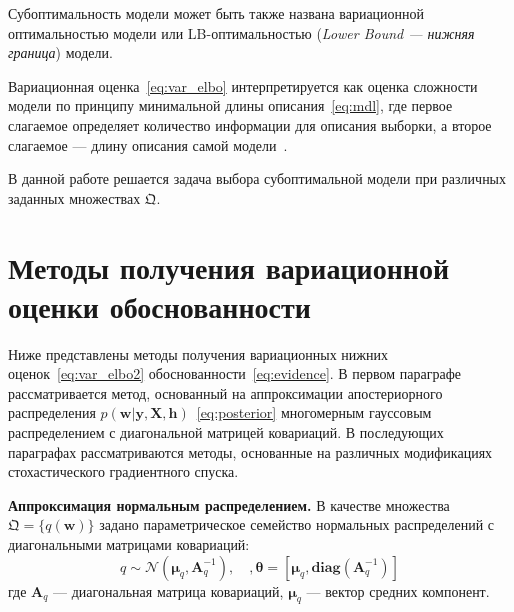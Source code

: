 {
Субоптимальность модели может быть также названа вариационной оптимальностью модели или LB-оптимальностью (\textit{Lower Bound --- нижняя граница}) модели.}

Вариационная оценка~\eqref{eq:var_elbo} интерпретируется как оценка сложности модели по принципу минимальной длины описания~\eqref{eq:mdl}, где первое слагаемое определяет количество информации для описания выборки, а второе слагаемое --- длину описания самой модели~\cite{nips}.

В данной работе решается задача выбора субоптимальной модели при различных заданных множествах $\mathfrak{Q}$.

\section{Методы получения вариационной оценки обоснованности}
Ниже представлены методы получения вариационных нижних оценок~\eqref{eq:var_elbo2} обоснованности~\eqref{eq:evidence}. В первом параграфе рассматривается метод, основанный на аппроксимации апостериорного распределения $p( \mathbf{w}|\mathbf{y}, \mathbf{X}, \mathbf{h})$~\eqref{eq:posterior} многомерным гауссовым распределением с диагональной матрицей ковариаций. В последующих параграфах рассматриваются методы, основанные на различных модификациях стохастического градиентного спуска. 

\textbf{Аппроксимация нормальным распределением. }
В качестве множества $\mathfrak{Q} = \{q(\mathbf{w})\}$ задано параметрическое семейство нормальных распределений с диагональными матрицами ковариаций:
\begin{equation}
\label{eq:diag}
	q \sim \mathcal{N}(\boldsymbol{\mu}_q, \mathbf{A}^{-1}_q),\quad,\boldsymbol{\theta}=[\boldsymbol{\mu}_q, \textbf{diag}(\mathbf{A}^{-1}_q)]
\end{equation}
где $\mathbf{A}_q$ --- диагональная матрица ковариаций, $\boldsymbol{\mu}_q$ --- вектор средних компонент.

